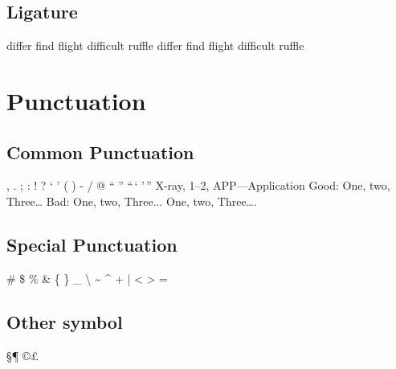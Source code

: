 \documentclass{article}
\begin{document}
        \subsection{Ligature}
            differ find flight difficult ruffle\newline
            dif{}fer f{}ind f\/light dif\/f\/icult ruffle

    \section{Punctuation}
        \subsection{Common Punctuation}
            , \quad . \quad ; \quad :\newline
            ! \quad ? \quad ` \quad '\newline
            ( \quad ) \quad [ \quad ]\newline
            \quad - \quad / \quad * \quad @\newline
            `` \quad '' \quad ``\,` '\,''\newline
            X-ray, 1--2, APP---Application\newline
            Good: One, two, Three\dots\newline
            Bad: One, two, Three...\newline
            One, two, Three\dots.
        
        \subsection{Special Punctuation} 
            \# \quad \$ \quad \% \quad \&\newline
            \{ \quad \} \quad \_ \quad \textbackslash\newline
            \~{} \quad \^{} \quad + | < > =

        \subsection{Other symbol}
            \S \quad \dag \quad \ddag \quad \P\newline
            \copyright \quad \textregistered \quad \texttrademark \quad \pounds \quad \textbullet\newline
            \texteuro \quad \textperthousand\newline
             \quad {} \quad {} \quad {}
\end{document}
